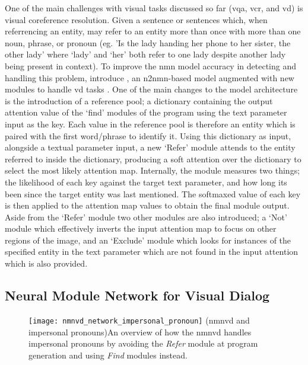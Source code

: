 One of the main challenges with visual tasks discussed so far (\gls{vqa}, \gls{vcr}, and \gls{vd}) is visual coreference resolution.
Given a sentence or sentences which, when referrencing an entity, may refer to an entity more than once with more than one noun, phrase, or pronoun (eg. 'Is the lady handing her phone to her sister, the other lady' where `lady' and `her' both refer to one lady despite another lady being present in context).
To improve the \gls{nmn} model accuracy in detecting and handling this problem, \citeauthor{kottur_visual_2018} introduce , an \gls{n2nmn}-based model augmented with new modules to handle \gls{vd} tasks \cite{kottur_visual_2018}.
One of the main changes to the model architecture is the introduction of a reference pool; a dictionary containing the output attention value of the `find' modules of the program using the text parameter input as the key.
Each value in the reference pool is therefore an entity which is paired with the first word/phrase to identify it.
Using this dictionary as input, alongside a textual parameter input, a new `Refer' module attends to the entity referred to inside the dictionary, producing a soft attention over the dictionary to select the most likely attention map.
Internally, the module measures two things; the likelihood of each key against the target text parameter, and how long its been since the target entity was last mentioned.
The softmaxed value of each key is then applied to the attention map values to obtain the final module output.
Aside from the `Refer' module two other modules are also introduced; a `Not' module which effectively inverts the input attention map to focus on other regions of the image, and an `Exclude' module which looks for instances of the specified entity in the text parameter which are not found in the input attention which is also provided.

\subsection{Neural Module Network for Visual Dialog}
\label{subsec:neural_module_network_for_visual_dialog}

\begin{figure}[htbp]
    \centering
    \texttt{[image: nmnvd\_network\_impersonal\_pronoun]}
    \captionsource(\acrshort{nmnvd} and impersonal pronouns){An overview of how the \acrshort{nmnvd} handles impersonal pronouns by avoiding the \textit{Refer} module at program generation and using \textit{Find} modules instead. \label{fig:nmnvd_network_impersonal_pronoun}}{\citeauthor{cho_visual_2021}\cite{cho_visual_2021}}
\end{figure}

